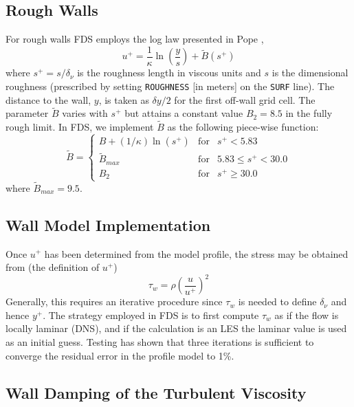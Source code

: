 \subsection{Rough Walls}
\label{rough_wall_model}

For rough walls FDS employs the log law presented in Pope \cite{Pope:2000},
\begin{equation}
\label{eqn_roughwallloglaw}
u^+ = \frac{1}{\kappa} \ln \left(\frac{y}{s}\right) + \tilde{B}(s^+)
\end{equation}
where $s^+ = s/\delta_\nu$ is the roughness length in viscous units and $s$ is the dimensional roughness (prescribed by setting {\tt ROUGHNESS} [in meters] on the {\tt SURF} line). The distance to the wall, $y$, is taken as $\delta y/2$ for the first off-wall grid cell.  The parameter $\tilde{B}$ varies with $s^+$ but attains a constant value $B_2=8.5$ in the fully rough limit.  In FDS, we implement $\tilde{B}$ as the following piece-wise function:
\begin{equation}
\tilde{B} = \left\{ \begin{array}{lll} B + (1/\kappa)\ln(s^+)  & \mbox{for} &          s^+ < 5.83 \\
                                       \tilde{B}_{max}         & \mbox{for} & 5.83 \le s^+ < 30.0 \\
                                       B_2                     & \mbox{for} &          s^+ \ge 30.0 \end{array} \right.
\end{equation}
where $\tilde{B}_{max} = 9.5$.

\subsection{Wall Model Implementation}
Once $u^+$ has been determined from the model profile, the stress may be obtained from (the definition of $u^+$)
\begin{equation}
\label{eqn_wall_stress}
\tau_w = \rho \left( \frac{u}{u^+} \right)^2
\end{equation}
Generally, this requires an iterative procedure since $\tau_w$ is needed to define $\delta_\nu$ and hence $y^+$.  The strategy employed in FDS is to first compute $\tau_w$ as if the flow is locally laminar (DNS), and if the calculation is an LES the laminar value is used as an initial guess.  Testing has shown that three iterations is sufficient to converge the residual error in the profile model to 1\%.

\subsection{Wall Damping of the Turbulent Viscosity}
\label{sec:wall_damping}

